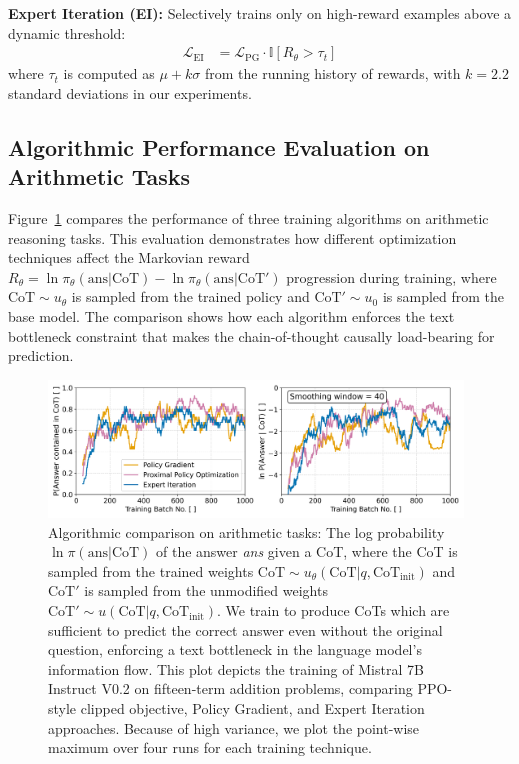 \documentclass{article}
\begin{document}
\textbf{Expert Iteration (EI):} Selectively trains only on high-reward examples above a dynamic threshold:
\begin{align}
\mathcal{L}_{\text{EI}} &= \mathcal{L}_{\text{PG}} \cdot \mathbb{I}[R_\theta > \tau_t]
\end{align}
where $\tau_t$ is computed as $\mu + k\sigma$ from the running history of rewards, with $k = 2.2$ standard deviations in our experiments.

\subsection{Algorithmic Performance Evaluation on Arithmetic Tasks}
Figure~\ref{fig:cot_arithmetic_performance} compares the performance of three training algorithms on arithmetic reasoning tasks. This evaluation demonstrates how different optimization techniques affect the Markovian reward $R_\theta = \ln \pi_\theta(\text{ans} | \text{CoT}) - \ln \pi_\theta(\text{ans} | \text{CoT}')$ progression during training, where $\text{CoT} \sim u_\theta$ is sampled from the trained policy and $\text{CoT}' \sim u_0$ is sampled from the base model. The comparison shows how each algorithm enforces the text bottleneck constraint that makes the chain-of-thought causally load-bearing for prediction.

\begin{figure}[ht]
    \centering
    \includegraphics[width=0.98\textwidth]{Figures/cot_performance_comparison.png}
    \caption{Algorithmic comparison on arithmetic tasks: The log probability $\ln \pi(\text{ans} | \text{CoT})$ of the answer \textit{ans} given a CoT, where the CoT is sampled from the trained weights $\text{CoT} \sim u_\theta(\text{CoT} | q, \text{CoT}_{\text{init}})$ and $\text{CoT}'$ is sampled from the unmodified weights $\text{CoT}' \sim u(\text{CoT} | q, \text{CoT}_{\text{init}})$. We train to produce CoTs which are sufficient to predict the correct answer even without the original question, enforcing a text bottleneck in the language model's information flow. This plot depicts the training of Mistral 7B Instruct V0.2 on fifteen-term addition problems, comparing PPO-style clipped objective, Policy Gradient, and Expert Iteration approaches. Because of high variance, we plot the point-wise maximum over four runs for each training technique.}
    \label{fig:cot_arithmetic_performance}
\end{figure}
\end{document}
